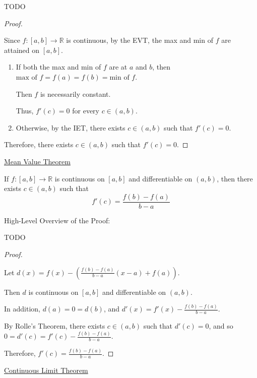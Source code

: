 \documentclass[12pt]{article}
\newcommand{\RR}{\mathbb{R}} %
\newcommand\parens[1]{\left( #1 \right)} %
\begin{document}
TODO

\dotfill

\begin{proof}
$ $

Since $f : [a, b] \rightarrow \RR$ is continuous, by the EVT, the max and min of $f$ are attained on $[a, b]$.

\begin{enumerate}
\item
If both the max and min of $f$ are at $a$ and $b$, then
\\
$\text{max of }f = f(a) = f(b) = \text{min of }f$.

Then $f$ is necessarily constant.

Thus, $f'(c) = 0$ for every $c \in (a, b)$.

\item
Otherwise, by the IET, there exists $c \in (a, b)$ such that $f'(c) = 0$.
\end{enumerate}

Therefore, there exists $c \in (a, b)$ such that $f'(c) = 0$.
\end{proof}

\pagebreak

\underline{Mean Value Theorem}

If $f : [a, b] \rightarrow \RR$ is continuous on $[a, b]$ and differentiable on $(a, b)$, then there exists $c \in (a, b)$ such that
\[
f'(c) = \frac{f(b) - f(a)}{b - a}
\]

\dotfill

High-Level Overview of the Proof:

TODO

\dotfill

\begin{proof}
$ $

Let $d(x) = f(x) - \parens{\frac{f(b) - f(a)}{b - a} (x - a) + f(a)}$.

Then $d$ is continuous on $[a, b]$ and differentiable on $(a, b)$.

In addition, $d(a) = 0 = d(b)$, and $d'(x) = f'(x) - \frac{f(b) - f(a)}{b - a}$.

By Rolle's Theorem, there exists $c \in (a, b)$ such that $d'(c) = 0$, and so
\\
$0 = d'(c) = f'(c) - \frac{f(b) - f(a)}{b - a}$.

Therefore, $f'(c) = \frac{f(b) - f(a)}{b - a}$.
\end{proof}

\pagebreak

\underline{Continuous Limit Theorem}
\end{document}
